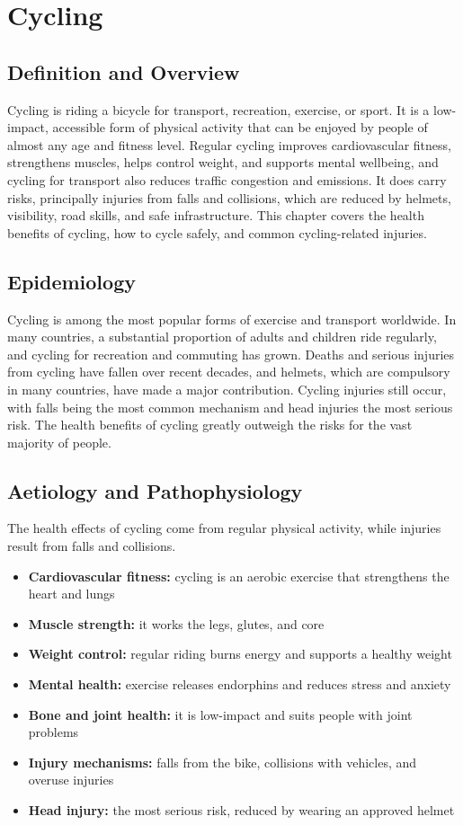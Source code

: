 \chapter{Cycling}

\section*{Definition and Overview}
Cycling is riding a bicycle for transport, recreation, exercise, or sport. It is a low-impact, accessible form of physical activity that can be enjoyed by people of almost any age and fitness level. Regular cycling improves cardiovascular fitness, strengthens muscles, helps control weight, and supports mental wellbeing, and cycling for transport also reduces traffic congestion and emissions. It does carry risks, principally injuries from falls and collisions, which are reduced by helmets, visibility, road skills, and safe infrastructure. This chapter covers the health benefits of cycling, how to cycle safely, and common cycling-related injuries.

\section*{Epidemiology}
Cycling is among the most popular forms of exercise and transport worldwide. In many countries, a substantial proportion of adults and children ride regularly, and cycling for recreation and commuting has grown. Deaths and serious injuries from cycling have fallen over recent decades, and helmets, which are compulsory in many countries, have made a major contribution. Cycling injuries still occur, with falls being the most common mechanism and head injuries the most serious risk. The health benefits of cycling greatly outweigh the risks for the vast majority of people.

\section*{Aetiology and Pathophysiology}
The health effects of cycling come from regular physical activity, while injuries result from falls and collisions.

\begin{itemize}
    \item \textbf{Cardiovascular fitness:} cycling is an aerobic exercise that strengthens the heart and lungs
    \item \textbf{Muscle strength:} it works the legs, glutes, and core
    \item \textbf{Weight control:} regular riding burns energy and supports a healthy weight
    \item \textbf{Mental health:} exercise releases endorphins and reduces stress and anxiety
    \item \textbf{Bone and joint health:} it is low-impact and suits people with joint problems
    \item \textbf{Injury mechanisms:} falls from the bike, collisions with vehicles, and overuse injuries
    \item \textbf{Head injury:} the most serious risk, reduced by wearing an approved helmet
\end{itemize}

